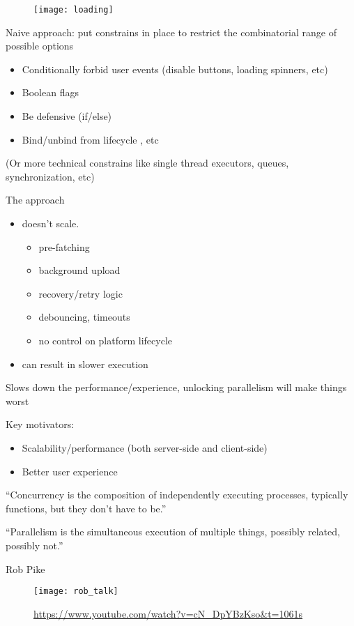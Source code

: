 \documentclass[10pt]{beamer}
\begin{document}
\begin{frame}[fragile]
	\begin{figure}
		\texttt{[image: loading]}
	\end{figure}
\end{frame}
\begin{frame}[fragile]
	Naive approach: put constrains in place to restrict the combinatorial range of possible options  
	\begin{itemize}
		\item Conditionally forbid user events (disable buttons, loading spinners, etc) 
		\item Boolean flags 
		\item Be defensive (if/else) 
		\item Bind/unbind from lifecycle , etc
	\end{itemize}
	(Or more technical constrains like single thread executors, queues, synchronization, etc)
\end{frame}

\begin{frame}
	The approach 
	\begin{itemize}
		\item doesn't scale. 
	\begin{itemize}
		\item pre-fatching
		\item background upload
		\item recovery/retry logic 
		\item debouncing, timeouts 
		\item no control on platform lifecycle
	\end{itemize}
\item can result in slower execution 
	\end{itemize}
	Slows down the performance/experience, unlocking parallelism will make things worst 
\end{frame}
\begin{frame}[fragile]
	Key motivators:
	\begin{itemize}
		\item Scalability/performance (both server-side  and client-side) 
		\item Better user experience 
	\end{itemize}



\end{frame}

\begin{frame}[fragile]
	``Concurrency is the composition of independently executing processes, typically functions, but they don't have to be.''

	``Parallelism is the simultaneous execution of multiple things, possibly related, possibly not.''

Rob Pike

\end{frame}
\begin{frame}[fragile]
	\begin{figure}
		\texttt{[image: rob\_talk]}
		\caption{\url{https://www.youtube.com/watch?v=cN_DpYBzKso&t=1061s}}
	\end{figure}
\end{frame}
\end{document}
